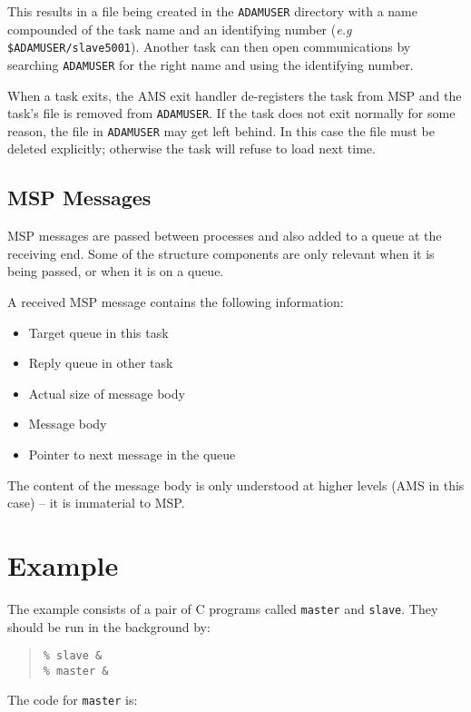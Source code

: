 \documentclass[twoside,11pt]{article}
\renewcommand{\_}{\texttt{\symbol{95}}}
\begin{document}
This results in a file being created in the \texttt{ADAM\_USER} directory 
with a name compounded of the task name and an identifying number
(\textit{e.g} \texttt{\$ADAM\_USER/slave\_5001}).
Another task can then open communications by searching \texttt{ADAM\_USER} for
the right name and using the identifying number.

When a task exits, the AMS exit handler de-registers the task from MSP and
the task's file is removed from \texttt{ADAM\_USER}.
If the task does not exit normally for some reason, the file in
\texttt{ADAM\_USER} may get left behind.
In this case the file must be deleted explicitly; otherwise the
task will refuse to load next time.

\subsection{MSP Messages}
MSP messages are passed between processes and also added to a queue at the
receiving end. Some of the structure components are only relevant when it is
being passed, or when it is on a queue.

A received MSP message contains the following information:
\begin{itemize}
\item Target queue in this task
\item Reply queue in other task
\item Actual size of message body
\item Message body
\item Pointer to next message in the queue
\end{itemize}
The content of the message body is only understood at higher levels (AMS in
this case) -- it is immaterial to MSP.

\newpage
\appendix
\section{\label{example}Example}
The example consists of a pair of C programs called \texttt{master} and 
\texttt{slave}.
They should be run in the background by:
\begin{quote}
\begin{verbatim}
% slave &
% master &
\end{verbatim}
\end{quote}

The code for \texttt{master} is:
\end{document}
